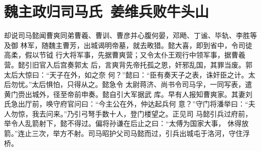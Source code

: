 \chapter{魏主政归司马氏~姜维兵败牛头山}

却说司马懿闻曹爽同弟曹羲、曹训、曹彦并心腹何晏，邓飏、丁谧、毕轨、李胜等及御
林军，随魏主曹芳，出城谒明帝墓，就去畋猎。懿大喜，即到省中，令司徒高柔，假以节钺
行大将军事，先据曹爽营；又令太仆王观行中领军事，据曹羲营。懿引旧官入后宫奏郭太
后，言爽背先帝托孤之恩，奸邪乱国，其罪当废。郭太后大惊曰：“天子在外，如之奈
何？”懿曰：“臣有奏天子之表，诛奸臣之计。太后勿忧。”太后惧怕，只得从之。懿急令
太尉蒋济、尚书令司马孚，一同写表，遣黄门赍出城外，径至帝前申奏。懿自引大军据武
库。早有人报知曹爽家。其妻刘氏急出厅前，唤守府官问曰：“今主公在外，仲达起兵何
意？”守门将潘举曰：“夫人勿惊，我去问来。”乃引弓弩手数十人，登门楼望之。正见司
马懿引兵过府前，举令人乱箭射下，懿不得过。偏将孙谦在后止之曰：“太傅为国家大事，
休得放箭。”连止三次，举方不射。司马昭护父司马懿而过，引兵出城屯于洛河，守住浮
桥。

